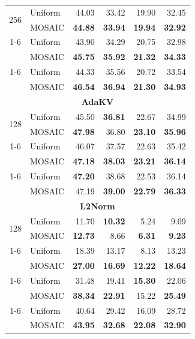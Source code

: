 \begin{table}[tp]
\begin{tabular}{@{} c l rrrr @{}}
    \multirow{2}{*}{256} & Uniform & 44.03 & 33.42 & 19.90 & 32.45 \\
     & MOSAIC & \textbf{44.88} & \textbf{33.94} & \textbf{19.94} & \textbf{32.92} \\
    \cmidrule(l){1-6}
    \multirow{2}{*}{512} & Uniform & 43.90 & 34.29 & 20.75 & 32.98 \\
     & MOSAIC & \textbf{45.75} & \textbf{35.92} & \textbf{21.32} & \textbf{34.33} \\
    \cmidrule(l){1-6}
    \multirow{2}{*}{1024} & Uniform & 44.33 & 35.56 & 20.72 & 33.54 \\
     & MOSAIC & \textbf{46.54} & \textbf{36.94} & \textbf{21.30} & \textbf{34.93} \\
    \midrule
    \multicolumn{6}{c}{\textbf{AdaKV}} \\
    \midrule
    \multirow{2}{*}{128} & Uniform & 45.50 & \textbf{36.81} & 22.67 & 34.99 \\
     & MOSAIC & \textbf{47.98} & 36.80 & \textbf{23.10} & \textbf{35.96} \\
    \cmidrule(l){1-6}
    \multirow{2}{*}{256} & Uniform & 46.07 & 37.57 & 22.63 & 35.42 \\
     & MOSAIC & \textbf{47.18} & \textbf{38.03} & \textbf{23.21} & \textbf{36.14} \\
    \cmidrule(l){1-6}
    \multirow{2}{*}{512} & Uniform & \textbf{47.20} & 38.68 & 22.53 & 36.14 \\
     & MOSAIC & 47.19 & \textbf{39.00} & \textbf{22.79} & \textbf{36.33} \\
    \midrule
    \multicolumn{6}{c}{\textbf{L2Norm}} \\
    \midrule
    \multirow{2}{*}{128} & Uniform & 11.70 & \textbf{10.32} & 5.24 & 9.09 \\
     & MOSAIC & \textbf{12.73} & 8.66 & \textbf{6.31} & \textbf{9.23} \\
    \cmidrule(l){1-6}
    \multirow{2}{*}{256} & Uniform & 18.39 & 13.17 & 8.13 & 13.23 \\
     & MOSAIC & \textbf{27.00} & \textbf{16.69} & \textbf{12.22} & \textbf{18.64} \\
    \cmidrule(l){1-6}
    \multirow{2}{*}{512} & Uniform & 31.48 & 19.41 & \textbf{15.30} & 22.06 \\
     & MOSAIC & \textbf{38.34} & \textbf{22.91} & 15.22 & \textbf{25.49} \\
    \cmidrule(l){1-6}
    \multirow{2}{*}{1024} & Uniform & 40.64 & 29.42 & 16.09 & 28.72 \\
     & MOSAIC & \textbf{43.95} & \textbf{32.68} & \textbf{22.08} & \textbf{32.90} \\

\end{tabular}
\end{table}
